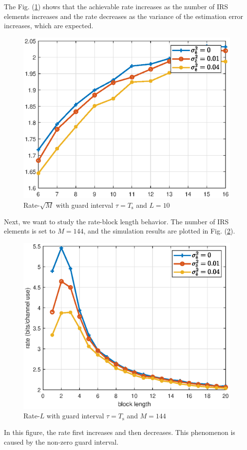 \documentclass[12pt,draftclsnofoot,onecolumn,journal]{IEEEtran}
\begin{document}
 The Fig. (\ref{fig:rateML10}) shows that the achievable rate increases as the number of IRS elements increases and the rate decreases as the variance of the estimation error increases, which are expected.
\begin{figure}[!htb]\flushleft
\includegraphics[width=6in]{rate-surdM.eps} 
\caption{Rate-$\sqrt M$ with guard interval $\tau=T_{\mathrm{s}}$ and $L=10$} \label{fig:rateML10}
\end{figure}

Next, we want to study the rate-block length behavior. The number of IRS elements is set to $M=144$, and the simulation results are plotted in Fig. (\ref{fig:rateLM12}).
\begin{figure}[!htb]\flushleft
\includegraphics[width=6in]{Rate_Lwithm12.eps} 
\caption{Rate-$L$ with guard interval $\tau=T_{\mathrm{s}}$ and $M=144$} \label{fig:rateLM12}
\end{figure}
In this figure, the rate first increases and then decreases. This phenomenon is caused by the non-zero guard interval.
\end{document}
